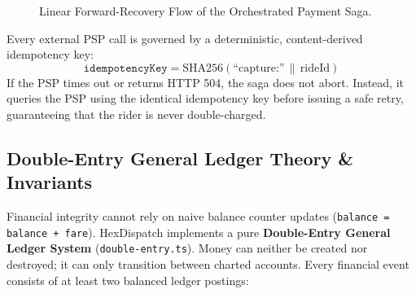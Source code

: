 \documentclass[11pt,a4paper]{article}
\begin{document}
\begin{figure}[htbp]
\centering
{}
\caption{Linear Forward-Recovery Flow of the Orchestrated Payment Saga.}
\label{fig:payment_saga}
\end{figure}

Every external PSP call is governed by a deterministic, content-derived idempotency key:
\begin{equation}
    \texttt{idempotencyKey} = \text{SHA256}(\text{``capture:''} \,\|\, \text{rideId})
\end{equation}
If the PSP times out or returns HTTP 504, the saga does not abort. Instead, it queries the PSP using the identical idempotency key before issuing a safe retry, guaranteeing that the rider is never double-charged.

\subsection{Double-Entry General Ledger Theory \& Invariants}
Financial integrity cannot rely on naive balance counter updates (\texttt{balance = balance + fare}). HexDispatch implements a pure \textbf{Double-Entry General Ledger System} (\texttt{double-entry.ts}). Money can neither be created nor destroyed; it can only transition between charted accounts. Every financial event consists of at least two balanced ledger postings:
\end{document}
